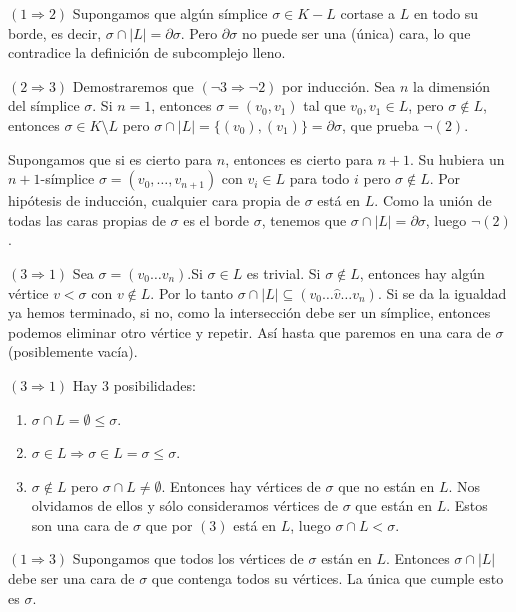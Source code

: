 \documentclass[twoside]{article}
\begin{document}
\begin{solucion}
$(1\Rightarrow 2)$ Supongamos que algún símplice $\sigma\in K-L$ cortase a $L$ en todo su borde, es decir, $σ \cap |L| = \partial σ$. Pero $\partial σ$ no puede ser una (única) cara, lo que contradice la definición de subcomplejo lleno.

$(2\Rightarrow 3)$ Demostraremos que $(\neg 3 \Rightarrow \neg 2)$ por inducción. Sea $n$ la dimensión del símplice $σ$. Si $n=1$, entonces $σ = (v_0,v_1)$ tal que $v_0,v_1 \in L$, pero $σ \notin L$, entonces $σ \in K \setminus L$ pero $σ \cap |L| = \{(v_0),(v_1)\} = \partial σ$, que prueba $\neg (2)$.

Supongamos que si es cierto para $n$, entonces es cierto para $n+1$. Su hubiera un $n+1$-símplice $σ = (v_0,\dots,v_{n+1})$ con $v_i \in L$ para todo $i$ pero $σ \notin L$. Por hipótesis de inducción, cualquier cara propia de $σ$ está en $L$. Como la unión de todas las caras propias de $σ$ es el borde $σ$, tenemos que $σ \cap |L| = \partial σ$, luego $\neg (2)$.

$(3\Rightarrow 1)$ Sea $\sigma=(v_0\dots v_n)$.Si $\sigma\in L$ es trivial. Si $\sigma\notin L$, entonces hay algún vértice $v<\sigma$ con $v\notin L$. Por lo tanto $\sigma\cap|L|\subseteq (v_0\dots \hat{v}\dots v_n)$. Si se da la igualdad ya hemos terminado, si no, como la intersección debe ser un símplice, entonces podemos eliminar otro vértice y repetir. Así hasta que paremos en una cara de $\sigma$ (posiblemente vacía).

$(3\Rightarrow 1)$ Hay 3 posibilidades:
\begin{enumerate}
\item $σ \cap L = \emptyset ≤ σ$.
\item $σ \in L \Rightarrow σ \in L = σ ≤ σ$.
\item $σ \notin L$ pero $σ \cap L \neq \emptyset$. Entonces hay vértices de $σ$ que no están en $L$. Nos olvidamos de ellos y sólo consideramos vértices de $σ$ que están en $L$. Estos son una cara de $σ$ que por $(3)$ está en $L$, luego $σ \cap L < σ$.
\end{enumerate}

$(1\Rightarrow 3)$ Supongamos que todos los vértices de $\sigma$ están en $L$. Entonces $\sigma\cap |L|$ debe ser una cara de $\sigma$ que contenga todos su vértices. La única que cumple esto es $\sigma$.
\end{solucion}

\newpage
\end{document}
